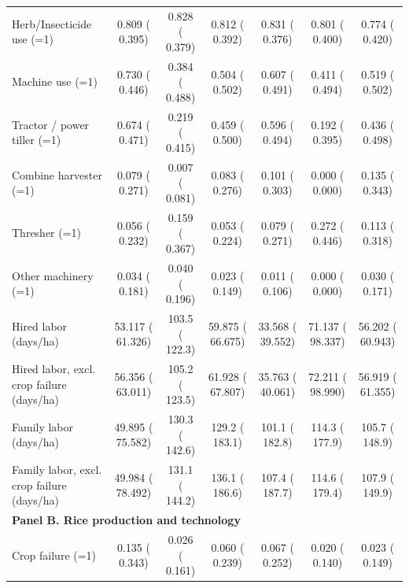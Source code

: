 \begin{tabular}{lcccccc}
Herb/Insecticide use (=1) &     0.809 (    0.395) &     0.828 (    0.379) &     0.812 (    0.392) &     0.831 (    0.376) &     0.801 (    0.400) &     0.774 (    0.420) \\
Machine use (=1) &     0.730 (    0.446) &     0.384 (    0.488) &     0.504 (    0.502) &     0.607 (    0.491) &     0.411 (    0.494) &     0.519 (    0.502) \\
\quad Tractor / power tiller (=1) &     0.674 (    0.471) &     0.219 (    0.415) &     0.459 (    0.500) &     0.596 (    0.494) &     0.192 (    0.395) &     0.436 (    0.498) \\
\quad Combine harvester (=1) &     0.079 (    0.271) &     0.007 (    0.081) &     0.083 (    0.276) &     0.101 (    0.303) &     0.000 (    0.000) &     0.135 (    0.343) \\
\quad Thresher (=1) &     0.056 (    0.232) &     0.159 (    0.367) &     0.053 (    0.224) &     0.079 (    0.271) &     0.272 (    0.446)\sym{**} &     0.113 (    0.318) \\
\quad Other machinery (=1) &     0.034 (    0.181) &     0.040 (    0.196) &     0.023 (    0.149) &     0.011 (    0.106) &     0.000 (    0.000) &     0.030 (    0.171) \\
Hired labor (days/ha) &    53.117 (   61.326) &        103.5 (       122.3)\sym{*} &    59.875 (   66.675) &    33.568 (   39.552) &    71.137 (   98.337)\sym{***} &    56.202 (   60.943)\sym{***} \\
\quad Hired labor, excl. crop failure (days/ha) &    56.356 (   63.011) &        105.2 (       123.5)\sym{*} &    61.928 (   67.807) &    35.763 (   40.061) &    72.211 (   98.990)\sym{***} &    56.919 (   61.355)\sym{***} \\
Family labor (days/ha) &    49.895 (   75.582) &        130.3 (       142.6)\sym{**} &        129.2 (       183.1) &        101.1 (       182.8) &        114.3 (       177.9) &        105.7 (       148.9) \\
\quad Family labor, excl. crop failure (days/ha) &    49.984 (   78.492) &        131.1 (       144.2)\sym{**} &        136.1 (       186.6)\sym{*} &        107.4 (       187.7) &        114.6 (       179.4) &        107.9 (       149.9) \\
\midrule
\multicolumn{7}{l}{\textbf{Panel B. Rice production and technology}} \\
Crop failure (=1) &     0.135 (    0.343) &     0.026 (    0.161)\sym{***} &     0.060 (    0.239)\sym{*} &     0.067 (    0.252) &     0.020 (    0.140) &     0.023 (    0.149) \\

\end{tabular}

